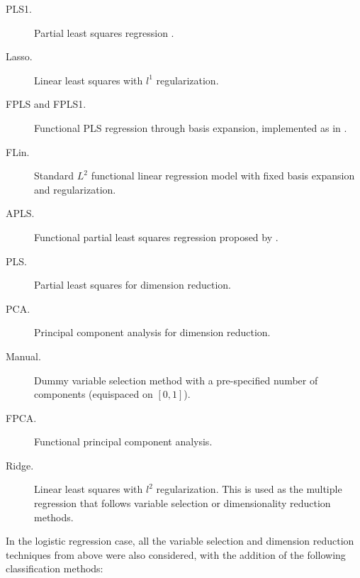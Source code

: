 \begin{description}
  \item [PLS1.] Partial least squares regression \citep[e.g.][]{abdi2010partial}.
  \item[Lasso.] Linear least squares with \(l^1\) regularization.
  \item [FPLS and FPLS1.] Functional PLS regression through basis expansion, implemented as in \citet{aguilera2010using}.
  \item [FLin.] Standard \(L^2\) functional linear regression model with fixed basis expansion and regularization.
  \item [APLS.] Functional partial least squares regression proposed by \citet{delaigle2012methodology}.
  \item [PLS.] Partial least squares for dimension reduction.
  \item [PCA.] Principal component analysis for dimension reduction.
  \item[Manual.] Dummy variable selection method with a pre-specified number of components (equispaced on \([0, 1]\)).
  \item [FPCA.] Functional principal component analysis.
  \item [Ridge.] Linear least squares with \(l^2\) regularization. This is used as the multiple regression that follows variable selection or dimensionality reduction methods.

\end{description}

In the logistic regression case, all the variable selection and dimension reduction techniques from above were also considered, with the addition of the following classification methods:

